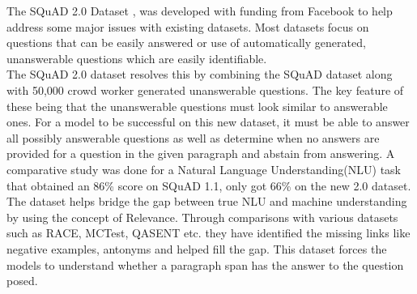 \documentclass[a4paper,12pt]{report}
\begin{document}
        The SQuAD 2.0 Dataset \citep{dataset}, was developed with funding from Facebook to help address some major issues with existing datasets. Most datasets focus on questions that can be easily answered or use of    automatically generated, unanswerable questions which are easily identifiable.\\
        The SQuAD 2.0 dataset resolves this by combining the SQuAD dataset along with 50,000 crowd worker generated unanswerable questions. The key feature of these being that the unanswerable questions must look similar to answerable ones. For a model to be successful on this new dataset, it must be able to answer all possibly answerable questions as well as determine when no answers are provided for a question in the given paragraph and abstain from answering. A comparative study was done for a Natural Language Understanding(NLU) task that obtained an 86\% score on SQuAD 1.1, only got 66\% on the new 2.0 dataset.
        The dataset helps bridge the gap between true NLU and machine understanding by using the concept of Relevance. Through comparisons with various datasets such as RACE, MCTest, QASENT etc. they have identified the missing links like negative examples, antonyms and helped fill the gap. This dataset forces the models to understand whether a paragraph span has the answer to the question posed.
\end{document}
